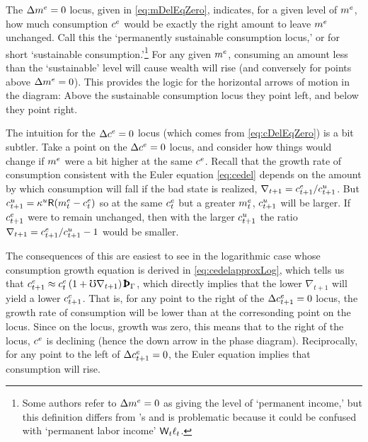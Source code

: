 \message{ !name(TractableBufferStock.tex)}\documentclass{handout}
\begin{document}
The $\Delta \mRatE_{\tSS} = 0$ locus, given in \eqref{eq:mDelEqZero},
indicates, for a given level of $\mRatE_{\tSS}$, how much consumption
$\cRatE_{\tSS}$ would be exactly the right amount to leave $m^{e}$
unchanged.  Call this the `permanently sustainable consumption locus,' or for short `sustainable consumption.'\footnote{Some authors refer to $\Delta \mRatE_{\tSS} = 0$ as giving the level of `permanent income,' but this definition differs from \cite{friedmanATheory}'s and is 
problematic because it could be confused with `permanent labor income' $\mathsf{W}_{t} \ell_{t}$.}  For any given $m^{e}$, consuming an amount less than the `sustainable' level will cause wealth will rise (and conversely for points above $\Delta m^{e} =0$).  This provides the logic for
the horizontal arrows of motion in the diagram: Above the sustainable consumption locus
they point left, and below they point right.


The intuition for the $\Delta \cRatE_{\tSS}=0$ locus (which comes from
\eqref{eq:cDelEqZero}) is a bit subtler.  Take a point on 
the $\Delta \cRatE_{\tSS}=0$ locus, and consider how things 
would change if $m^{e}$ were a bit higher at the same $c^{e}$.  
Recall that the growth rate of consumption consistent with 
the Euler equation \eqref{eq:cedel} depends on the amount by which consumption will
fall if the bad state is realized, $\nabla_{t+1} = c^{e}_{t+1}/c^{u}_{t+1}$.  
But $c^{u}_{t+1} = \kappa^{u} \mathsf{R} (m^{e}_{t} - c^{e}_{t})$ so at the same $c^{e}_{t}$ but 
a greater $m^{e}_{t}$, $c^{u}_{t+1}$ will be larger.  If $c^{e}_{t+1}$ were to remain
unchanged, then with the larger $c^{u}_{t+1}$ the ratio $\nabla_{t+1} = c^{e}_{t+1}/c^{u}_{t+1}-1$ would 
be smaller.

The consequences of this are easiest to see in the logarithmic case whose consumption growth equation is derived in \eqref{eq:cedelapproxLog}, which tells us that $\cRatE_{t+1} \approx \cRatE_{t}\left(1+ \urate \nabla _{t+1}\right) {\PatPGro}$, which directly 
implies that the lower $\nabla_{t+1}$ will yield a lower $c^{e}_{t+1}$.  That is, for any point to the right of the $\Delta c^{e}_{t+1}=0$ locus, the growth rate of consumption will be lower than at the corresonding point on the locus.  Since on the locus, growth
was zero, this means that to the right of the locus, $c^{e}$ is declining (hence the down arrow in the phase diagram).  Reciprocally, for any point to the left of $\Delta c^{e}_{t+1}=0$, the Euler equation implies that consumption will rise.
\end{document}
